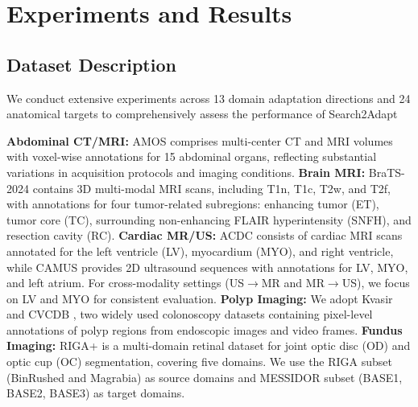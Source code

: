 \documentclass[sigconf, screen]{acmart}
\begin{document}
\section{Experiments and Results}
\subsection{Dataset Description}
We conduct extensive experiments across 13 domain adaptation directions and 24 anatomical targets to comprehensively assess the performance of Search2Adapt

\textbf{Abdominal CT/MRI:}
AMOS \cite{amos} comprises multi-center CT and MRI volumes with voxel-wise annotations for 15 abdominal organs, reflecting substantial variations in acquisition protocols and imaging conditions.
\textbf{Brain MRI:}
BraTS-2024 \cite{brats2024}  contains 3D multi-modal MRI scans, including T1n, T1c, T2w, and T2f, with annotations for four tumor-related subregions: enhancing tumor (ET), tumor core (TC), surrounding non-enhancing FLAIR hyperintensity (SNFH), and resection cavity (RC).
\textbf{Cardiac MR/US:}
ACDC \cite{acdc} consists of cardiac MRI scans annotated for the left ventricle (LV), myocardium (MYO), and right ventricle, while CAMUS \cite{CAMUS} provides 2D ultrasound sequences with annotations for LV, MYO, and left atrium. For cross-modality settings (US$\rightarrow$MR and MR$\rightarrow$US), we focus on LV and MYO for consistent evaluation.
\textbf{Polyp Imaging:}
We adopt Kvasir \cite{kvasir} and CVCDB \cite{CVCDB}, two widely used colonoscopy datasets containing pixel-level annotations of polyp regions from endoscopic images and video frames.
\textbf{Fundus Imaging:}
RIGA+ \cite{RIGA+} is a multi-domain retinal dataset for joint optic disc (OD) and optic cup (OC) segmentation, covering five domains. We use the RIGA subset (BinRushed and Magrabia) as source domains and MESSIDOR subset (BASE1, BASE2, BASE3) as target domains.

%



\end{document}
